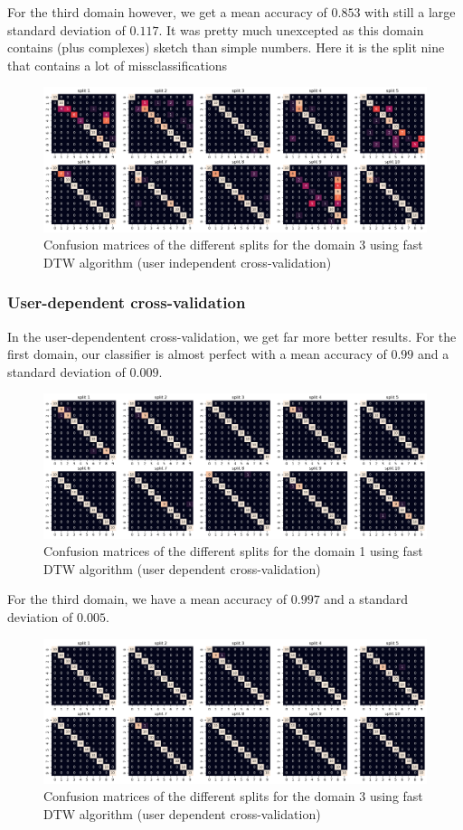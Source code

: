 For the third domain however, we get a mean accuracy of $0.853$ with still a large standard deviation of $0.117$. It was pretty much unexcepted as this domain contains (plus complexes) sketch than simple numbers. Here it is the split nine that contains a lot of missclassifications

\begin{figure}[H]
	\centering
	\includegraphics{figures/dtw/domain03/cm_dtw_d3_uindep.png}
	\caption{Confusion matrices of the different splits for the domain 3 using fast DTW algorithm (user independent cross-validation)}
	\label{fig:cm-dtw-d3-uindep}
\end{figure}

\subsubsection{User-dependent cross-validation}

In the user-dependentent cross-validation, we get far more better results. For the first domain, our classifier is almost perfect with a mean accuracy of $0.99$ and a standard deviation of $0.009$.

\begin{figure}[H]
	\centering
	\includegraphics{figures/dtw/domain01/cm_dtw_d1_udep.png}
	\caption{Confusion matrices of the different splits for the domain 1 using fast DTW algorithm (user dependent cross-validation)}
	\label{fig:cm-dtw-d1-udep}
\end{figure}

For the third domain, we have a mean accuracy of $0.997$ and a standard deviation of $0.005$.

\begin{figure}[H]
	\centering
	\includegraphics{figures/dtw/domain03/cm_dtw_d3_udep.png}
	\caption{Confusion matrices of the different splits for the domain 3 using fast DTW algorithm (user dependent cross-validation)}
	\label{fig:cm-dtw-d3-udep}
\end{figure}